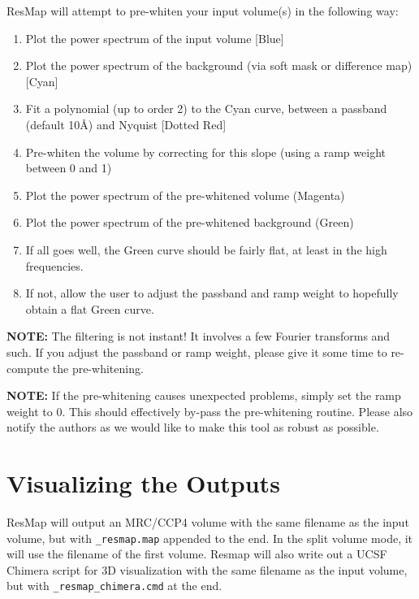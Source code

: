 \documentclass[10pt]{article}
\begin{document}
ResMap will attempt to pre-whiten your input volume(s) in the following way:
\begin{enumerate}
	\item Plot the power spectrum of the input volume [Blue]
	\item Plot the power spectrum of the background (via soft mask or difference map) [Cyan]
	\item Fit a polynomial (up to order 2) to the Cyan curve, between a passband (default 10\AA{}) and Nyquist [Dotted Red]
	\item Pre-whiten the volume by correcting for this slope (using a ramp weight between 0 and 1)
	\item Plot the power spectrum of the pre-whitened volume (Magenta)
	\item Plot the power spectrum of the pre-whitened background (Green)
	\item If all goes well, the Green curve should be fairly flat, at least in the high frequencies.
	\item If not, allow the user to adjust the passband and ramp weight to hopefully obtain a flat Green curve.
\end{enumerate}

\textcolor{RedOrange}{\textbf{NOTE:}}  The filtering is not instant! It involves a few Fourier transforms and such. If you adjust the passband or ramp weight, please give it some time to re-compute the pre-whitening.

\textcolor{RedOrange}{\textbf{NOTE:}} If the pre-whitening causes unexpected problems, simply set the ramp weight to 0. This should effectively by-pass the pre-whitening routine. Please also notify the authors as we would like to make this tool as robust as possible.

\section{Visualizing the Outputs}
ResMap will output an MRC/CCP4 volume with the same filename as the input volume, but with \texttt{\_resmap.map} appended to the end. In the split volume mode, it will use the filename of the first volume. Resmap will also write out a UCSF Chimera script for 3D visualization with the same filename as the input volume, but with \texttt{\_resmap\_chimera.cmd} at the end.
\end{document}
